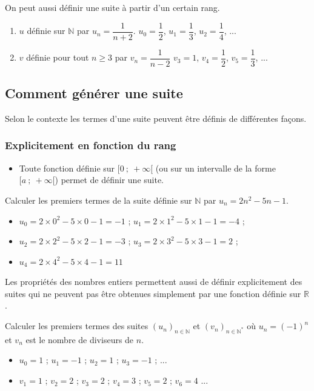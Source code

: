 \documentclass[french]{book}
\newcommand{\R}{\mathbb {R}}
\newcommand{\N}{\mathbb {N}}
\newcommand{\se}{\geq}
\newcommand{\suite}[1][u]{\left( #1_{n} \right)_{n\in\N}}
\newcommand{\suitep}[1][u]{\left( #1_{n} \right)_{n\in\N^{*}}}
\begin{document}
\begin{rem}
On peut aussi définir une suite à partir d'un certain rang.
\end{rem}

\begin{exemple}
\begin{enumerate}
\item $u$ définie sur $\N$ par $u_{n}=\dfrac{1}{n+2}$.
\hspace{2em} $u_0=\dfrac{1}{2}$, $u_1=\dfrac{1}{3}$, $u_2=\dfrac{1}{4}$, ...
\item $v$ définie pour tout $n\se3$ par $v_{n}=\dfrac{1}{n-2}$
\hspace{2em} $v_3=1$, $v_4=\dfrac{1}{2}$, $v_5=\dfrac{1}{3}$, ...
\end{enumerate}
\end{exemple}


\subsection{Comment générer une suite}
Selon le contexte les termes d'une suite peuvent être définis de différentes façons.
\subsubsection*{Explicitement en fonction du rang}
\begin{itemize}


\item Toute fonction définie sur $[0~;~+\infty[$ (ou sur un intervalle de la forme $[a~;~+\infty[$) permet de définir une suite.
\end{itemize}
\begin{exemple}
Calculer les premiers termes de la suite définie sur $\N$ par $u_{n}=2n^2-5n-1$.
\begin{itemize}
\item $u_0=2\times0^2-5\times0-1=-1$ ; $u_1=2\times1^2-5\times1-1=-4$ ;
\item $u_2=2\times2^2-5\times2-1=-3$ ; $u_3=2\times3^2-5\times3-1=2$ ;
\item $u_4=2\times4^2-5\times4-1=11$
\end{itemize}
\end{exemple}

\begin{rem} 
Les propriétés des nombres entiers permettent aussi de définir explicitement des suites qui ne peuvent pas être obtenues simplement par une fonction définie sur $\R$.
\end{rem}
\begin{exemple}
Calculer les premiers termes des suites $\suite[u]$ et $\suitep[v]$ où $u_{n}=(-1)^{n}$ et $v_{n}$ est le nombre de diviseurs de $n$.

\begin{itemize}

\item $u_0=1$ ; $u_1=-1$ ; $u_2=1$ ; $u_3=-1$ ; ...
\vspace*{1.5ex}
\item $v_1=1$ ; $v_2=2$ ; $v_3=2$ ; $v_4=3$ ; $v_5=2$ ; $v_6=4$ ...
\end{itemize}
\end{exemple}
\end{document}
